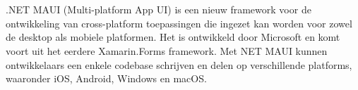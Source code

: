 
%
%
%
%
%

%



\chapter*{}

.NET MAUI (Multi-platform App UI) is een nieuw framework voor de ontwikkeling van cross-platform toepassingen die ingezet kan worden voor zowel de desktop als mobiele platformen. Het is ontwikkeld door Microsoft en komt voort uit het eerdere Xamarin.Forms framework. Met NET MAUI kunnen ontwikkelaars een enkele codebase schrijven en delen op verschillende platforms, waaronder iOS, Android, Windows en macOS.

